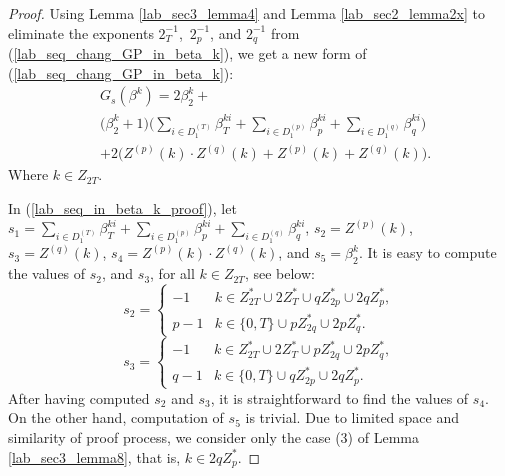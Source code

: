 \documentclass{mcom-l}
\theoremstyle{definition}
\numberwithin{equation}{section}
\begin{document}
     \begin{proof}
     Using Lemma \ref{lab_sec3_lemma4} and Lemma \ref{lab_sec2_lemma2x} to eliminate the exponents $ 2_{T}^{-1} $,\  $ 2_{p}^{-1} $, and $ 2_{q}^{-1} $ from (\ref{lab_seq_chang_GP_in_beta_k}), we get a new form of (\ref{lab_seq_chang_GP_in_beta_k}):
     \begin{equation}\label{lab_seq_in_beta_k_proof}
     \begin{split}
      &G_{s}(\beta^{k})=2\beta_{2}^{k}+\\
      &\biggl(\beta_{2}^{k}+1\biggr)\biggl(\sum_{i\in D_{1}^{(T)}}\beta_{T}^{ki}+\sum_{i\in D_{1}^{(p)}}\beta_{p}^{ki}+\sum_{i\in D_{1}^{(q)}}\beta_{q}^{ki}\biggr)\\
      &+2\biggl(Z^{(p)}(k)\cdot Z^{(q)}(k)+Z^{(p)}(k)+Z^{(q)}(k)\biggr).
     \end{split}
     \end{equation}
     Where $ k\in Z_{2T} $.
     
     In (\ref{lab_seq_in_beta_k_proof}), let $ s_{1}=\sum_{i\in D_{1}^{(T)}}\beta_{T}^{ki}+\sum_{i\in D_{1}^{(p)}}\beta_{p}^{ki}+\sum_{i\in D_{1}^{(q)}}\beta_{q}^{ki} $, $s_{2}= Z^{(p)}(k) $, $s_{3}= Z^{(q)}(k) $, $s_{4}= Z^{(p)}(k)\cdot Z^{(q)}(k) $, and $ s_{5}= \beta_{2}^{k}$. It is easy to compute  the values of $ s_{2}$, and $ s_{3} $, for all $ k\in Z_{2T} $, see below:
     \begin{equation}\label{lab_sec3_L3_prf_s2}
     s_{2}= \begin{cases}
     -1  &k\in Z_{2T}^{*}\cup 2Z_{T}^{*}\cup qZ_{2p}^{*}\cup 2qZ_{p}^{*},\\
     p-1 &k\in\lbrace 0,T\rbrace \cup pZ_{2q}^{*}\cup 2pZ_{q}^{*}.
     \end{cases}
     \end{equation}
     \begin{equation}\label{lab_sec3_L3_prf_s3}
     s_{3}= \begin{cases}
     -1  &k\in Z_{2T}^{*}\cup 2Z_{T}^{*}\cup pZ_{2q}^{*}\cup 2pZ_{q}^{*},\\
     q-1 &k\in\lbrace 0,T\rbrace \cup qZ_{2p}^{*}\cup 2qZ_{p}^{*}.
     \end{cases}
     \end{equation}
     After having computed $ s_{2} $ and $ s_{3} $, it is straightforward to find the values of $ s_{4} $. On the other hand, computation of $ s_{5} $ is trivial. Due to limited space and similarity of proof process, we consider only the case (3) of Lemma \ref{lab_sec3_lemma8}, that is, $ k\in 2qZ_{p}^{*} $. 
     

\end{proof}
\end{document}
